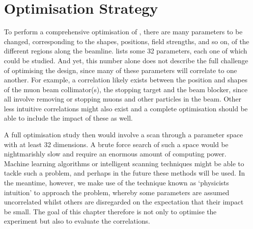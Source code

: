 \section{Optimisation Strategy}
To perform a comprehensive optimisation of \phaseII, there are many parameters to be changed, corresponding to the shapes, positions, field strengths, and so on, of the different regions along the beamline.
 lists some 32 parameters, each one of which could be studied.
And yet, this number alone does not describe the full challenge of optimising the \phaseII design, since many of these parameters will correlate to one another.
For example, a correlation likely exists between the position and shapes of the muon beam collimator(s), the stopping target and the beam blocker, since all involve removing or stopping muons and other particles in the beam.
Other less intuitive correlations might also exist and a complete optimisation should be able to include the impact of these as well.

A full optimisation study then would involve a scan through a parameter space with at least 32 dimensions.
A brute force search of such a space would be nightmarishly slow and require an enormous amount of computing power.
Machine learning algorithms or intelligent scanning techniques might be able to tackle such a problem, and perhaps in the future these methods will be used.
In the meantime, however, we make use of the technique known as `physicists intuition' to approach the problem, whereby some parameters are assumed uncorrelated whilst others are disregarded on the expectation that their impact be small.
The goal of this chapter therefore is not only to optimise the experiment but also to evaluate the correlations.

